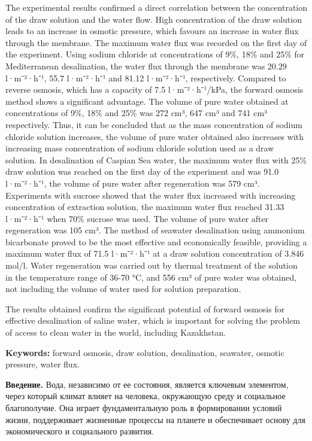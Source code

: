 The experimental results confirmed a direct correlation between the
concentration of the draw solution and the water flow. High
concentration of the draw solution leads to an increase in osmotic
pressure, which favours an increase in water flux through the membrane.
The maximum water flux was recorded on the first day of the experiment.
Using sodium chloride at concentrations of 9\%, 18\% and 25\% for
Mediterranean desalination, the water flux through the membrane was
20.29 l·m⁻²·h⁻¹, 55.7 l·m⁻²·h⁻¹ and 81.12 l·m⁻²·h⁻¹, respectively.
Compared to reverse osmosis, which has a capacity of 7.5 l·m⁻²·h⁻¹/kPa,
the forward osmosis method shows a significant advantage. The volume of
pure water obtained at concentrations of 9\%, 18\% and 25\% was 272 cm³,
647 cm³ and 741 cm³ respectively. Thus, it can be concluded that as the
mass concentration of sodium chloride solution increases, the volume of
pure water obtained also increases with increasing mass concentration of
sodium chloride solution used as a draw solution. In desalination of
Caspian Sea water, the maximum water flux with 25\% draw solution was
reached on the first day of the experiment and was 91.0 l·m⁻²·h⁻¹, the
volume of pure water after regeneration was 579 cm³. Experiments with
sucrose showed that the water flux increased with increasing
concentration of extraction solution, the maximum water flux reached
31.33 l·m⁻²·h⁻¹ when 70\% sucrose was used. The volume of pure water
after regeneration was 105 cm³. The method of seawater desalination
using ammonium bicarbonate proved to be the most effective and
economically feasible, providing a maximum water flux of 71.5 l·m⁻²·h⁻¹
at a draw solution concentration of 3.846 mol/l. Water regeneration was
carried out by thermal treatment of the solution in the temperature
range of 36-70 °C, and 556 cm³ of pure water was obtained, not including
the volume of water used for solution preparation.

The results obtained confirm the significant potential of forward
osmosis for effective desalination of saline water, which is important
for solving the problem of access to clean water in the world, including
Kazakhstan.

{\bfseries Keywords:} forward osmosis, draw solution, desalination,
seawater, osmotic pressure, water flux.

{\bfseries Введение.} Вода, независимо от ее состояния, является ключевым
элементом, через который климат влияет на человека, окружающую среду и
социальное благополучие. Она играет фундаментальную роль в формировании
условий жизни, поддерживает жизненные процессы на планете и обеспечивает
основу для экономического и социального развития.

